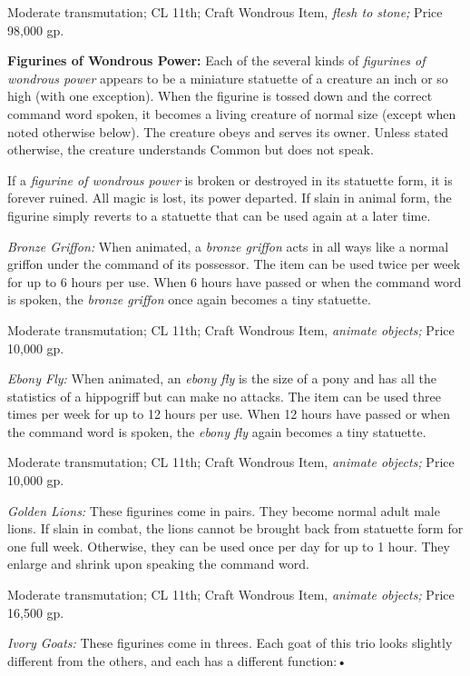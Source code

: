 Moderate transmutation; CL 11th; Craft Wondrous Item, \textit{flesh to stone; }Price 
98,000 gp.

\textbf{Figurines of Wondrous Power:} Each of the several kinds of \textit{figurines 
of wondrous power }appears to be a miniature statuette of a creature an inch or 
so high (with one exception). When the figurine is tossed down and the correct 
command word spoken, it becomes a living creature of normal size (except when noted 
otherwise below). The creature obeys and serves its owner. Unless stated otherwise, 
the creature understands Common but does not speak.

If a \textit{figurine of wondrous power }is broken or destroyed in its statuette 
form, it is forever ruined. All magic is lost, its power departed. If slain in 
animal form, the figurine simply reverts to a statuette that can be used again 
at a later time.

\textit{Bronze Griffon: }When animated, a \textit{bronze griffon }acts in all ways 
like a normal griffon under the command of its possessor. The item can be used 
twice per week for up to 6 hours per use. When 6 hours have passed or when the 
command word is spoken, the \textit{bronze griffon }once again becomes a tiny statuette.

Moderate transmutation; CL 11th; Craft Wondrous Item, \textit{animate objects; 
}Price 10,000 gp.

\textit{Ebony Fly: }When animated, an \textit{ebony fly }is the size of a pony 
and has all the statistics of a hippogriff but can make no attacks. The item can 
be used three times per week for up to 12 hours per use. When 12 hours have passed 
or when the command word is spoken, the \textit{ebony fly }again becomes a tiny 
statuette.

Moderate transmutation; CL 11th; Craft Wondrous Item, \textit{animate objects; 
}Price 10,000 gp.

\textit{Golden Lions: }These figurines come in pairs. They become normal adult 
male lions. If slain in combat, the lions cannot be brought back from statuette 
form for one full week. Otherwise, they can be used once per day for up to 1 hour. 
They enlarge and shrink upon speaking the command word.

Moderate transmutation; CL 11th; Craft Wondrous Item, \textit{animate objects; 
}Price 16,500 gp.

\textit{Ivory Goats: }These figurines come in threes. Each goat of this trio looks 
slightly different from the others, and each has a different function:•


